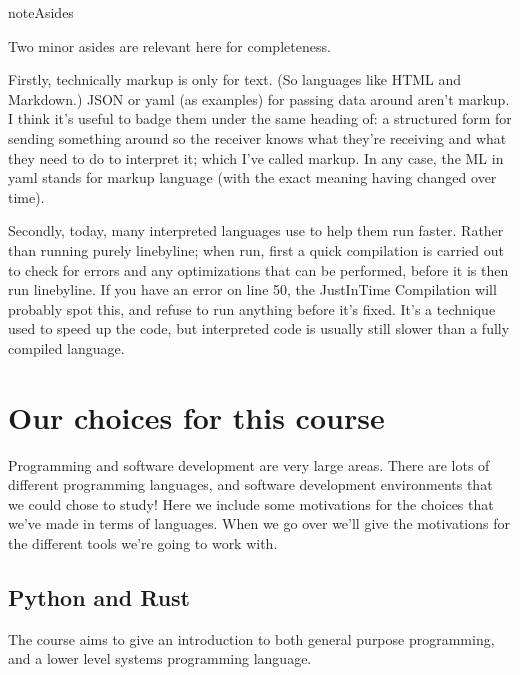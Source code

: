 \documentclass[letterpaper,10pt,british]{sphinxmanual}
\begin{document}
\begin{sphinxadmonition}{note}{Asides}

\sphinxAtStartPar
Two minor asides are relevant here for completeness.

\sphinxAtStartPar
Firstly, technically markup is only for text. (So languages like HTML and Markdown.) JSON or yaml (as examples) for passing data around aren’t markup. I think it’s useful to badge them under the same heading of: a structured form for sending something around so the receiver knows what they’re receiving and what they need to do to interpret it; which I’ve called markup. In any case, the ML in yaml stands for markup language (with the exact meaning having changed over time).

\sphinxAtStartPar
Secondly, today, many interpreted languages use  to help them run faster. Rather than running purely line\sphinxhyphen{}by\sphinxhyphen{}line; when run, first a quick compilation is carried out to check for errors and any optimizations that can be performed, before it is then run line\sphinxhyphen{}by\sphinxhyphen{}line. If you have an error on line 50, the Just\sphinxhyphen{}In\sphinxhyphen{}Time Compilation will probably spot this, and refuse to run anything before it’s fixed. It’s a technique used to speed up the code, but interpreted code is usually still slower than a fully compiled language.
\end{sphinxadmonition}

\sphinxstepscope


\section{Our choices for this course}
\label{\detokenize{chapters/motivation/our_choices:our-choices-for-this-course}}\label{\detokenize{chapters/motivation/our_choices:motivation}}\label{\detokenize{chapters/motivation/our_choices::doc}}
\sphinxAtStartPar
Programming and software development are very large areas. There are lots of different programming languages, and software development environments that we could chose to study! Here we include some motivations for the choices that we’ve made in terms of languages. When we go over {\hyperref[\detokenize{chapters/software_development_tools:software-tools}]{}} we’ll give the motivations for the different tools we’re going to work with.


\subsection{Python and Rust}
\label{\detokenize{chapters/motivation/our_choices:python-and-rust}}
\sphinxAtStartPar
The course aims to give an introduction to both general purpose programming, and a lower level systems programming language.
\end{document}

